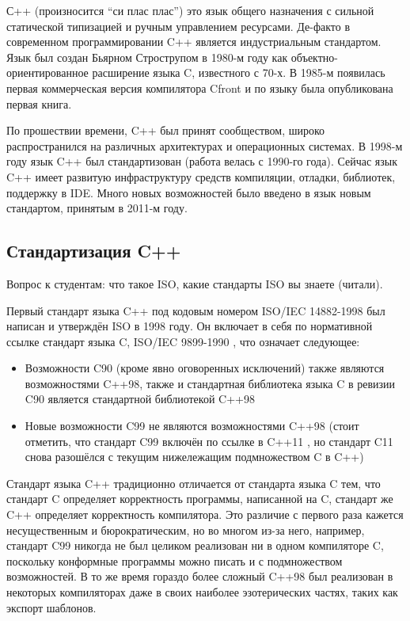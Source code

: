 \documentclass[a4paper,12pt,oneside]{article}
\begin{document}
С++ (произносится ``си плас плас'') это язык общего назначения с сильной статической типизацией и ручным управлением ресурсами. Де-факто в современном программировании C++ является индустриальным стандартом. Язык был создан Бьярном Строструпом в 1980-м году как объектно-ориентированное расширение языка C, известного с 70-х. В 1985-м появилась первая коммерческая версия компилятора Cfront и по языку была опубликована первая книга. 

По прошествии времени, C++ был принят сообществом, широко распространился на различных архитектурах и операционных системах. В 1998-м году язык C++ был стандартизован (работа велась с 1990-го года). Сейчас язык C++ имеет развитую инфраструктуру средств компиляции, отладки, библиотек, поддержку в IDE. Много новых возможностей было введено в язык новым стандартом, принятым в 2011-м году.

\subsection{Стандартизация C++}

Вопрос к студентам: что такое ISO, какие стандарты ISO вы знаете (читали).

Первый стандарт языка C++ под кодовым номером ISO/IEC 14882-1998 \cite{stdcpp98} был написан и утверждён ISO в 1998 году. Он включает в себя по нормативной ссылке стандарт языка C, ISO/IEC 9899-1990 \cite{stdc90}, что означает следующее: 
\begin{itemize}
\item
Возможности C90 (кроме явно оговоренных исключений) также являются возможностями C++98, также и стандартная библиотека языка C в ревизии C90 является стандартной библиотекой C++98
\item
Новые возможности C99 \cite{stdc90} не являются возможностями C++98 (стоит отметить, что стандарт C99 включён по ссылке в C++11 \cite{stdcpp11}, но стандарт C11 \cite{stdc11} снова разошёлся с текущим нижележащим подмножеством C в C++)
\end{itemize}

Стандарт языка C++ традиционно отличается от стандарта языка C тем, что стандарт C определяет корректность программы, написанной на C, стандарт же C++ определяет корректность компилятора. Это различие с первого раза кажется несущественным и бюрократическим, но во многом из-за него, например, стандарт C99 никогда не был целиком реализован ни в одном компиляторе C, поскольку конформные программы можно писать и с подмножеством возможностей. В то же время гораздо более сложный C++98 был реализован в некоторых компиляторах даже в своих наиболее эзотерических частях, таких как экспорт шаблонов.
\end{document}
